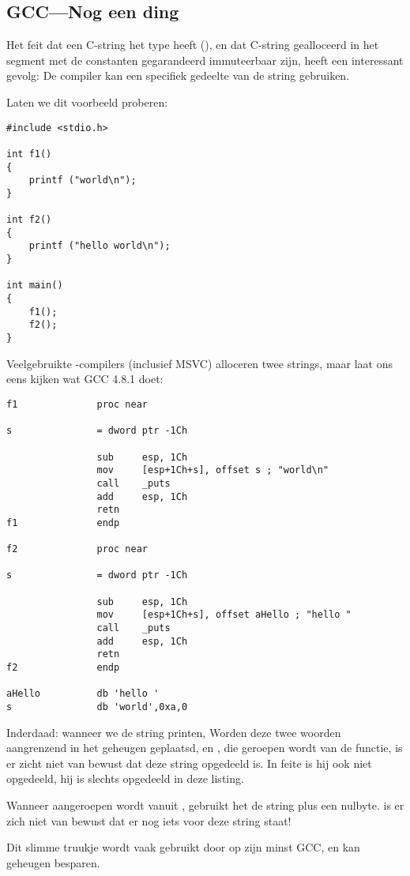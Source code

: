 \subsection{GCC---Nog een ding}
\label{use_parts_of_C_strings}

Het feit dat een  C-string het type  heeft (), 
en dat C-string gealloceerd in het segment met de constanten gegarandeerd immuteerbaar zijn, heeft een interessant gevolg:
De compiler kan een specifiek gedeelte van de string gebruiken.

Laten we dit voorbeeld proberen:

\begin{lstlisting}[style=customc]
#include <stdio.h>

int f1()
{
	printf ("world\n");
}

int f2()
{
	printf ("hello world\n");
}

int main()
{
	f1();
	f2();
}
\end{lstlisting}

Veelgebruikte \CCpp{}-compilers (inclusief MSVC) alloceren twee strings, maar laat ons eens kijken wat GCC 4.8.1 doet:

\begin{lstlisting}[caption=GCC 4.8.1 + IDA,style=customasm]
f1              proc near

s               = dword ptr -1Ch

                sub     esp, 1Ch
                mov     [esp+1Ch+s], offset s ; "world\n"
                call    _puts
                add     esp, 1Ch
                retn
f1              endp

f2              proc near

s               = dword ptr -1Ch

                sub     esp, 1Ch
                mov     [esp+1Ch+s], offset aHello ; "hello "
                call    _puts
                add     esp, 1Ch
                retn
f2              endp

aHello          db 'hello '
s               db 'world',0xa,0
\end{lstlisting}

Inderdaad: wanneer we de  string printen, 
Worden deze twee woorden aangrenzend in het geheugen geplaatsd, en \puts, die geroepen wordt van de 
functie, is er zicht niet van bewust dat deze string opgedeeld is. 
In feite is hij ook niet opgedeeld, hij is slechts  opgedeeld in deze listing.

Wanneer \puts aangeroepen wordt vanuit , gebruikt het de  string plus een nulbyte. \puts is er zich niet van bewust dat er nog iets voor deze string staat!

Dit slimme truukje wordt vaak gebruikt door op zijn minst GCC, en kan geheugen besparen.

